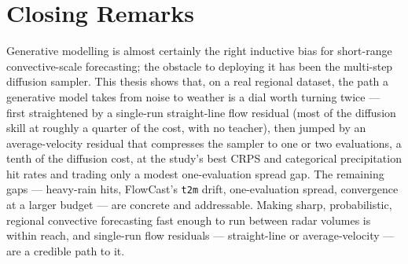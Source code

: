 \section{Closing Remarks}
\label{sec:concl-closing}

Generative modelling is almost certainly the right inductive bias for short-range convective-scale forecasting; the obstacle to deploying it has been the multi-step diffusion sampler. This thesis shows that, on a real regional dataset, the path a generative model takes from noise to weather is a dial worth turning twice --- first straightened by a single-run straight-line flow residual (most of the diffusion skill at roughly a quarter of the cost, with no teacher), then jumped by an average-velocity residual that compresses the sampler to one or two evaluations, a tenth of the diffusion cost, at the study's best CRPS and categorical precipitation hit rates and trading only a modest one-evaluation spread gap. The remaining gaps --- heavy-rain hits, FlowCast's \texttt{t2m} drift, one-evaluation spread, convergence at a larger budget --- are concrete and addressable. Making sharp, probabilistic, regional convective forecasting fast enough to run between radar volumes is within reach, and single-run flow residuals --- straight-line or average-velocity --- are a credible path to it.
